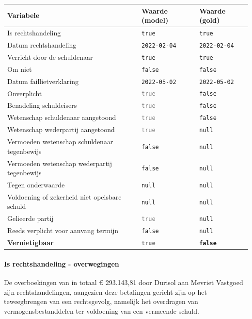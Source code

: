 \documentclass[
  dutch,
  a4paper,
]{article}
\begin{document}
\begin{center}
\small
\begin{tabular}{@{}p{7.4cm}p{2.6cm}p{2.6cm}@{}}
\toprule
Variabele & Waarde (model) & Waarde (gold) \\
\midrule
Is rechtshandeling & \texttt{true} & \texttt{true} \\
Datum rechtshandeling & \texttt{2022-02-04} & \texttt{2022-02-04} \\
Verricht door de schuldenaar & \texttt{true} & \texttt{true} \\
Om niet & \texttt{false} & \texttt{false} \\
Datum faillietverklaring & \texttt{2022-05-02} & \texttt{2022-05-02} \\
Onverplicht & \textcolor{gray}{\texttt{true}} & \texttt{false} \\
Benadeling schuldeisers & \textcolor{gray}{\texttt{true}} & \texttt{false} \\
Wetenschap schuldenaar aangetoond & \textcolor{gray}{\texttt{true}} & \texttt{false} \\
Wetenschap wederpartij aangetoond & \textcolor{gray}{\texttt{true}} & \texttt{null} \\
Vermoeden wetenschap schuldenaar tegenbewijs & \texttt{false} & \texttt{null} \\
Vermoeden wetenschap wederpartij tegenbewijs & \texttt{false} & \texttt{null} \\
Tegen onderwaarde & \texttt{null} & \texttt{null} \\
Voldoening of zekerheid niet opeisbare schuld & \texttt{null} & \texttt{null} \\
Gelieerde partij & \textcolor{gray}{\texttt{true}} & \texttt{null} \\
Reeds verplicht voor aanvang termijn & \texttt{false} & \texttt{null} \\
\textbf{Vernietigbaar} & \textbf{\textcolor{gray}{\texttt{true}}} & \textbf{\texttt{false}} \\
\bottomrule
\end{tabular}
\end{center}

\paragraph{Is rechtshandeling - overwegingen}\label{is-rechtshandeling---overwegingen-17}

De overboekingen van in totaal € 293.143,81 door Durisol aan Mevriet Vastgoed zijn rechtshandelingen, aangezien deze betalingen gericht zijn op het teweegbrengen van een rechtsgevolg, namelijk het overdragen van vermogensbestanddelen ter voldoening van een vermeende schuld.
\end{document}
